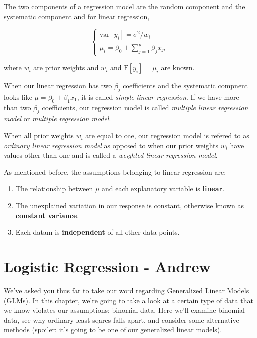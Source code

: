 \documentclass[
]{book}
\providecommand{\tightlist}{%
  \setlength{\itemsep}{0pt}\setlength{\parskip}{0pt}}
\begin{document}
The two components of a regression model are the random component and the systematic component and for linear regression,

\[
\begin{cases}
  \text{var}[y_i] = \sigma^2/w_i \\
  \mu_i = \beta_0 + \sum_{j=1}^{p}\beta_jx_{ji}
\end{cases}
\]

where \(w_i\) are prior weights and \(w_i\) and \(\text{E}[y_i] = \mu_i\) are known.

When our linear regression has two \(\beta_j\) coefficients and the systematic compnent looks like \(\mu = \beta_0 + \beta_1x_1\), it is called \emph{simple linear regression}. If we have more than two \(\beta_j\) coefficients, our regression model is called \emph{multiple linear regression model} or \emph{multiple regression model}.

When all prior weights \(w_i\) are equal to one, our regression model is refered to as \emph{ordinary linear regression model} as opposed to when our prior weights \(w_i\) have values other than one and is called a \emph{weighted linear regression model}.

As mentioned before, the assumptions belonging to linear regression are:

\begin{enumerate}
\def\labelenumi{\arabic{enumi}.}
\tightlist
\item
  The relationship between \(\mu\) and each explanatory variable is \textbf{linear}.
\item
  The unexplained variation in our response is constant, otherwise known as \textbf{constant variance}.
\item
  Each datam is \textbf{independent} of all other data points.
\end{enumerate}

\hypertarget{logistic-regression---andrew}{%
\chapter{Logistic Regression - Andrew}\label{logistic-regression---andrew}}

We've asked you thus far to take our word regarding Generalized Linear Models (GLMs). In this chapter, we're going to take a look at a certain type of data that we know violates our assumptions: binomial data. Here we'll examine binomial data, see why ordinary least sqares falls apart, and consider some alternative methods (spoiler: it's going to be one of our generalized linear models).
\end{document}
